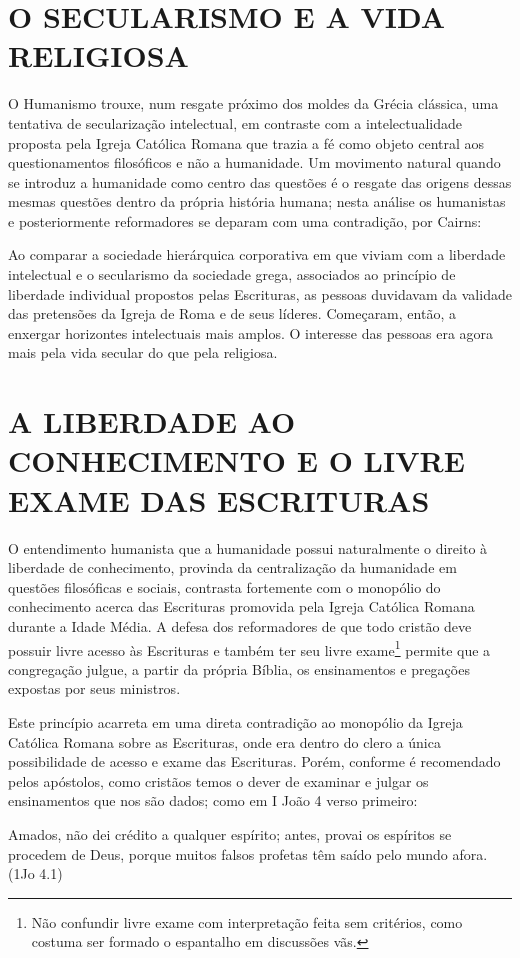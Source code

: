 \documentclass[
    article,            %
	12pt,				%
	oneside,			%
	a4paper,			%
	chapter=TITLE,		%
	section=TITLE,		%
	english,			%
	french,				%
	spanish,			%
	brazil				%
	]{abntex2}
\begin{document}
\section{O SECULARISMO E A VIDA RELIGIOSA}
O Humanismo trouxe, num resgate próximo dos moldes da Grécia clássica, uma tentativa de secularização intelectual, em contraste com a intelectualidade proposta pela Igreja Católica Romana que trazia a fé como objeto central aos questionamentos filosóficos e não a humanidade. Um movimento natural quando se introduz a humanidade como centro das questões é o resgate das origens dessas mesmas questões dentro da própria história humana; nesta análise os humanistas e posteriormente reformadores se deparam com uma contradição, por Cairns:
\begin{citacao}
Ao comparar a sociedade hierárquica corporativa em que viviam com a liberdade intelectual e o secularismo da sociedade grega, associados ao princípio de liberdade individual propostos pelas Escrituras, as pessoas duvidavam da validade das pretensões da Igreja de Roma e de seus líderes. Começaram, então, a enxergar horizontes intelectuais mais amplos. O interesse das pessoas era agora mais pela vida secular do que pela religiosa. \cite[p. 254]{CAIRNS}
\end{citacao}


\section{A LIBERDADE AO CONHECIMENTO E O LIVRE EXAME DAS ESCRITURAS}
O entendimento humanista que a humanidade possui naturalmente o direito à liberdade de conhecimento, provinda da centralização da humanidade em questões filosóficas e sociais, contrasta fortemente com o monopólio do conhecimento acerca das Escrituras promovida pela Igreja Católica Romana durante a Idade Média.  A defesa dos reformadores de que todo cristão deve possuir livre acesso às Escrituras e também ter seu livre exame\footnote{Não confundir livre exame com interpretação feita sem critérios, como costuma ser formado o espantalho em discussões vãs.} permite que a congregação julgue, a partir da própria Bíblia, os ensinamentos e pregações expostas por seus ministros.

Este princípio acarreta em uma direta contradição ao monopólio da Igreja Católica Romana sobre as Escrituras, onde era dentro do clero a única possibilidade de acesso e exame das Escrituras. Porém, conforme é recomendado pelos apóstolos, como cristãos temos o dever de examinar e julgar os ensinamentos que nos são dados; como em I João 4 verso primeiro:
\begin{citacao}
Amados, não dei crédito a qualquer espírito; antes, provai os espíritos se procedem de Deus, porque muitos falsos profetas têm saído pelo mundo afora. (1Jo 4.1)
\end{citacao}
\end{document}
